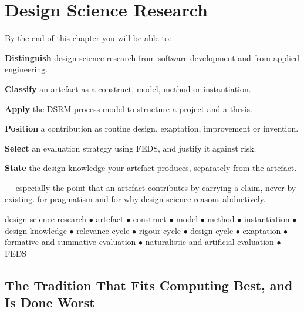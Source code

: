 \chapter{Design Science Research}\label{ch:designscience}

\begin{outcomes}
By the end of this chapter you will be able to:
\begin{tight}
  \item \textbf{Distinguish} design science research from software development
    and from applied engineering.
  \item \textbf{Classify} an artefact as a construct, model, method or
    instantiation.
  \item \textbf{Apply} the DSRM process model to structure a project and a
    thesis.
  \item \textbf{Position} a contribution as routine design, exaptation,
    improvement or invention.
  \item \textbf{Select} an evaluation strategy using FEDS, and justify it
    against risk.
  \item \textbf{State} the design knowledge your artefact produces, separately
    from the artefact.
\end{tight}
\end{outcomes}

\begin{prereq}
 --- especially the point that an artefact contributes by
carrying a claim, never by existing.  for pragmatism and for
why design science reasons abductively.
\end{prereq}

\begin{keyterms}
design science research $\bullet$ artefact $\bullet$ construct $\bullet$ model
$\bullet$ method $\bullet$ instantiation $\bullet$ design knowledge $\bullet$
relevance cycle $\bullet$ rigour cycle $\bullet$ design cycle $\bullet$
exaptation $\bullet$ formative and summative evaluation $\bullet$ naturalistic
and artificial evaluation $\bullet$ FEDS
\end{keyterms}

\section{The Tradition That Fits Computing Best, and Is Done Worst}

